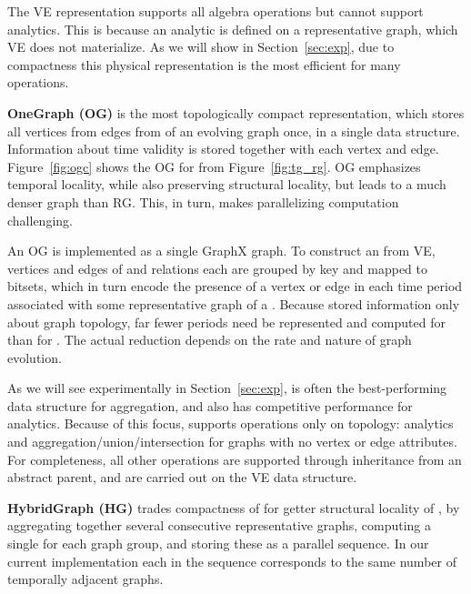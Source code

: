 
The VE representation supports all \tg algebra operations but cannot
support analytics.  This is because an analytic is defined on a
representative graph, which VE does not materialize.  As we will show
in Section~\ref{sec:exp}, due to compactness this physical
representation is the most efficient for many operations.

{\bf OneGraph (OG)} is the most topologically compact representation,
which stores all vertices from  edges from \tae of an
evolving graph once, in a single data structure.  Information about
time validity is stored together with each vertex and edge.
Figure~\ref{fig:ogc} shows the OG for \tg {} from
Figure~\ref{fig:tg_rg}.  OG emphasizes temporal locality, while also
preserving structural locality, but leads to a much denser graph than
RG.  This, in turn, makes parallelizing computation challenging.

An OG is implemented as a single GraphX graph.  To construct an \og
from VE, vertices and edges of \tv and \te relations each are grouped
by key and mapped to bitsets, which in turn encode the presence of a
vertex or edge in each time period associated with some representative
graph of a \tg.  Because \og stored information only about graph
topology, far fewer periods need be represented and computed for \og
than for \rg.  The actual reduction depends on the rate and nature of
graph evolution.

As we will see experimentally in Section~\ref{sec:exp}, \og is often
the best-performing data structure for aggregation, and also has
competitive performance for analytics.  Because of this focus, \og
supports operations only on topology: analytics and
aggregation/union/intersection for graphs with no vertex or edge
attributes.  For completeness, all other operations are supported
through inheritance from an abstract parent, and are carried out on
the VE data structure.

{\bf HybridGraph (HG)} trades compactness of \og for getter structural
locality of \rg, by aggregating together several consecutive
representative graphs, computing a single \og for each graph group,
and storing these as a parallel sequence.  In our current
implementation each \og in the sequence corresponds to the same number
of temporally adjacent graphs.

